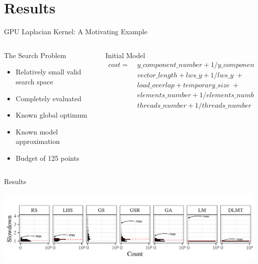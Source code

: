 \documentclass[10pt, compress, aspectratio=169, xcolor={table,usenames,dvipsnames}]{beamer}
\begin{document}
\section{Results}
\label{sec:org9d9b3fe}
\begin{frame}[label={sec:org47acbda}]{GPU Laplacian Kernel: A Motivating Example}
\begin{columns}
\begin{column}{0.5\columnwidth}
\begin{block}{The Search Problem}
\begin{itemize}
\item Relatively \alert{small valid search space}
\item \alert{Completely evaluated}
\item Known \alert{global optimum}
\item Known \alert{model approximation}
\item \alert{Budget} of \alert{125 points}
\end{itemize}
\end{block}
\end{column}

\begin{column}{0.5\columnwidth}
\begin{block}{Initial Model}
\footnotesize
\begin{align*}
cost = & \; y\_component\_number + 1 / y\_component\_number \; + \\
& \; vector\_length + lws\_y + 1 / lws\_y \; + \\
& \; load\_overlap + temporary\_size \; + \\
& \; elements\_number + 1 / elements\_number \; + \\
& \; threads\_number + 1 / threads\_number
\end{align*}
\normalsize
\end{block}
\end{column}
\end{columns}

\begin{block}{Results}
\vspace{-.3cm}

\begin{center}
\begin{center}
\includegraphics[width=.88\columnwidth]{../../../img/comparison_histogram.pdf}
\end{center}
\end{center}
\end{block}
\end{frame}
\end{document}
